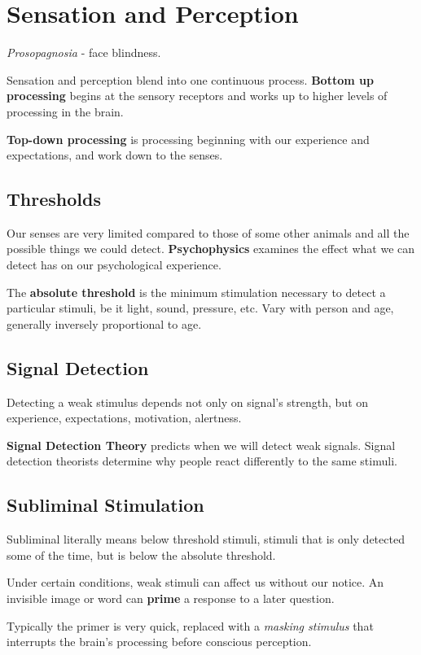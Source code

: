 \documentclass[12pt]{article}
\begin{document}
\section*{Sensation and Perception}
\textit{Prosopagnosia} - face blindness. 

Sensation and perception blend into one continuous process. \textbf{Bottom up processing} begins at the sensory receptors and works up to higher levels of processing in the brain.

\textbf{Top-down processing} is processing beginning with our experience and expectations, and work down to the senses. 

\subsection{Thresholds}
Our senses are very limited compared to those of some other animals and all the possible things we could detect. \textbf{Psychophysics} examines the effect what we can detect has on our psychological experience.

The \textbf{absolute threshold} is the minimum stimulation necessary to detect a particular stimuli, be it light, sound, pressure, etc. Vary with person and age, generally inversely proportional to age.

\subsection*{Signal Detection}
Detecting a weak stimulus depends not only on signal's strength, but on experience, expectations, motivation, alertness.

\textbf{Signal Detection Theory} predicts when we will detect weak signals. Signal detection theorists determine why people react differently to the same stimuli.

\subsection*{Subliminal Stimulation}
Subliminal literally means below threshold stimuli, stimuli that is only detected some of the time, but is below the absolute threshold.

Under certain conditions, weak stimuli can affect us without our notice. An invisible image or word can \textbf{prime} a response to a later question.

Typically the primer is very quick, replaced with a \textit{masking stimulus} that interrupts the brain's processing before conscious perception. 
\end{document}
